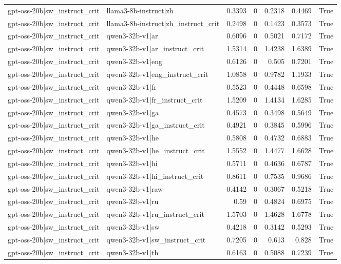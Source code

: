 \begin{table}
\begin{tabular}{l l r r r r l}
gpt-oss-20b|sw_instruct_crit & llama3-8b-instruct|zh & 0.3393 & 0 & 0.2318 & 0.4469 & True \\
gpt-oss-20b|sw_instruct_crit & llama3-8b-instruct|zh_instruct_crit & 0.2498 & 0 & 0.1423 & 0.3573 & True \\
gpt-oss-20b|sw_instruct_crit & qwen3-32b-v1|ar & 0.6096 & 0 & 0.5021 & 0.7172 & True \\
gpt-oss-20b|sw_instruct_crit & qwen3-32b-v1|ar_instruct_crit & 1.5314 & 0 & 1.4238 & 1.6389 & True \\
gpt-oss-20b|sw_instruct_crit & qwen3-32b-v1|eng & 0.6126 & 0 & 0.505 & 0.7201 & True \\
gpt-oss-20b|sw_instruct_crit & qwen3-32b-v1|eng_instruct_crit & 1.0858 & 0 & 0.9782 & 1.1933 & True \\
gpt-oss-20b|sw_instruct_crit & qwen3-32b-v1|fr & 0.5523 & 0 & 0.4448 & 0.6598 & True \\
gpt-oss-20b|sw_instruct_crit & qwen3-32b-v1|fr_instruct_crit & 1.5209 & 0 & 1.4134 & 1.6285 & True \\
gpt-oss-20b|sw_instruct_crit & qwen3-32b-v1|ga & 0.4573 & 0 & 0.3498 & 0.5649 & True \\
gpt-oss-20b|sw_instruct_crit & qwen3-32b-v1|ga_instruct_crit & 0.4921 & 0 & 0.3845 & 0.5996 & True \\
gpt-oss-20b|sw_instruct_crit & qwen3-32b-v1|he & 0.5808 & 0 & 0.4732 & 0.6883 & True \\
gpt-oss-20b|sw_instruct_crit & qwen3-32b-v1|he_instruct_crit & 1.5552 & 0 & 1.4477 & 1.6628 & True \\
gpt-oss-20b|sw_instruct_crit & qwen3-32b-v1|hi & 0.5711 & 0 & 0.4636 & 0.6787 & True \\
gpt-oss-20b|sw_instruct_crit & qwen3-32b-v1|hi_instruct_crit & 0.8611 & 0 & 0.7535 & 0.9686 & True \\
gpt-oss-20b|sw_instruct_crit & qwen3-32b-v1|raw & 0.4142 & 0 & 0.3067 & 0.5218 & True \\
gpt-oss-20b|sw_instruct_crit & qwen3-32b-v1|ru & 0.59 & 0 & 0.4824 & 0.6975 & True \\
gpt-oss-20b|sw_instruct_crit & qwen3-32b-v1|ru_instruct_crit & 1.5703 & 0 & 1.4628 & 1.6778 & True \\
gpt-oss-20b|sw_instruct_crit & qwen3-32b-v1|sw & 0.4218 & 0 & 0.3142 & 0.5293 & True \\
gpt-oss-20b|sw_instruct_crit & qwen3-32b-v1|sw_instruct_crit & 0.7205 & 0 & 0.613 & 0.828 & True \\
gpt-oss-20b|sw_instruct_crit & qwen3-32b-v1|th & 0.6163 & 0 & 0.5088 & 0.7239 & True \\

\end{tabular}
\end{table}
